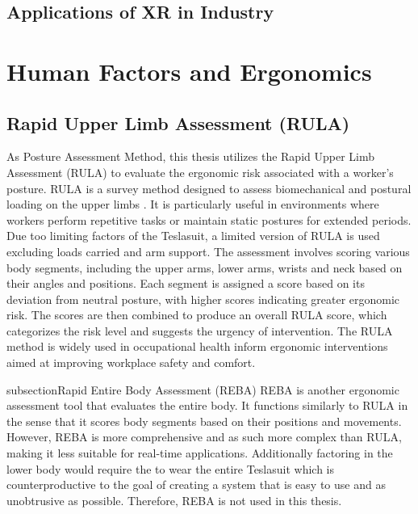 \subsection{Applications of XR in Industry}

\section{Human Factors and Ergonomics}
\subsection{Rapid Upper Limb Assessment (RULA)}
As Posture Assessment Method, this thesis utilizes the Rapid Upper Limb Assessment (RULA) to evaluate the ergonomic risk associated with a worker's posture. RULA is a survey method designed to assess biomechanical and postural loading on the upper limbs \cite{MCATAMNEY199391}. It is particularly useful in environments where workers perform repetitive tasks or maintain static postures for extended periods. Due too limiting factors of the Teslasuit, a limited version of RULA is used excluding loads carried and arm support. The assessment involves scoring various body segments, including the upper arms, lower arms, wrists and neck based on their angles and positions. Each segment is assigned a score based on its deviation from neutral posture, with higher scores indicating greater ergonomic risk. The scores are then combined to produce an overall RULA score, which categorizes the risk level and suggests the urgency of intervention. The RULA method is widely used in occupational health inform ergonomic interventions aimed at improving workplace safety and comfort.

subsection{Rapid Entire Body Assessment (REBA)}
REBA is another ergonomic assessment tool that evaluates the entire body. It functions similarly to RULA in the sense that it scores body segments based on their positions and movements.\cite{chiasson2012comparison} However, REBA is more comprehensive and as such more complex than RULA, making it less suitable for real-time applications. Additionally factoring in the lower body would require the to wear the entire Teslasuit which is counterproductive to the goal of creating a system that is easy to use and as unobtrusive as possible. Therefore, REBA is not used in this thesis.
